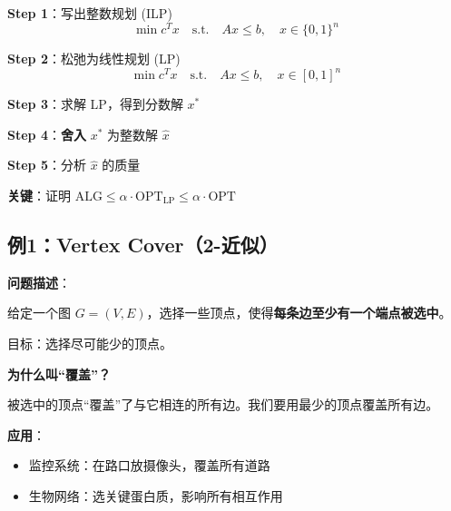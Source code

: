 \documentclass[12pt, a4paper]{ctexart}
\begin{document}
\begin{blackboard}[连续化的统一框架]

\textbf{Step 1}：写出整数规划 (ILP)
\[
\min c^T x \quad \text{s.t.} \quad Ax \leq b, \quad x \in \{0, 1\}^n
\]

\textbf{Step 2}：松弛为线性规划 (LP)
\[
\min c^T x \quad \text{s.t.} \quad Ax \leq b, \quad x \in [0, 1]^n
\]

\textbf{Step 3}：求解 LP，得到分数解 $x^*$

\textbf{Step 4}：\textbf{舍入} $x^*$ 为整数解 $\hat{x}$

\textbf{Step 5}：分析 $\hat{x}$ 的质量

\begin{center}
\end{center}

\textbf{关键}：证明 $\text{ALG} \leq \alpha \cdot \text{OPT}_{\text{LP}} \leq \alpha \cdot \text{OPT}$

\end{blackboard}

\subsection{例1：Vertex Cover（2-近似）}

\begin{blackboard}

\textbf{问题描述}：

给定一个图 $G = (V, E)$，选择一些顶点，使得\textbf{每条边至少有一个端点被选中}。

目标：选择尽可能少的顶点。

\textbf{为什么叫``覆盖''？}

被选中的顶点``覆盖''了与它相连的所有边。我们要用最少的顶点覆盖所有边。

\textbf{应用}：
\begin{itemize}
    \item 监控系统：在路口放摄像头，覆盖所有道路
    \item 生物网络：选关键蛋白质，影响所有相互作用
\end{itemize}

\end{blackboard}
\end{document}
